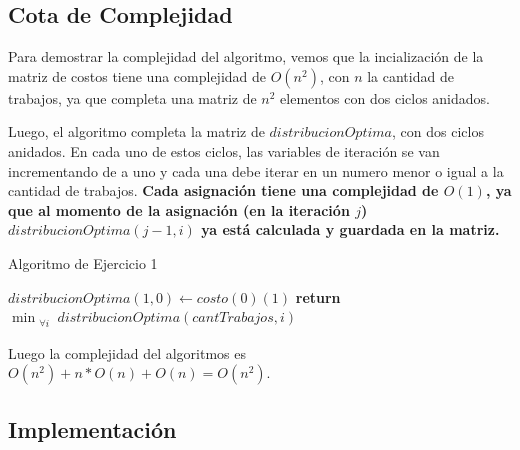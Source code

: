 \subsection{Cota de Complejidad}
Para demostrar la complejidad del algoritmo, vemos que la incialización de la matriz de costos
tiene una complejidad de $O(n^2)$, con $n$ la cantidad de trabajos, ya que completa una matriz de $n^2$ elementos con dos ciclos anidados.

Luego, el algoritmo completa la matriz de $distribucionOptima$, con dos ciclos anidados. En cada uno de estos ciclos,
las variables de iteración se van incrementando de a uno y cada una debe iterar
en un numero menor o igual a la cantidad de trabajos.
\textbf{Cada asignación tiene una complejidad de $O(1)$, ya que al momento de la asignación (en la iteración $j$)
$distribucionOptima(j-1,i)$ ya está calculada y guardada en la matriz.}\\

\begin{algorithm}[H]
	\caption{Algoritmo de Ejercicio 1}
	$distribucionOptima(1,0) \longleftarrow costo(0)(1)$	         
	\textbf{return} $ \displaystyle \min_{\substack{\forall i}} distribucionOptima(cantTrabajos,i) $	
\end{algorithm}

Luego la complejidad del algoritmos es $ O(n^2) + n * O(n) + O(n) = O(n^2).$

\subsection{Implementación}

